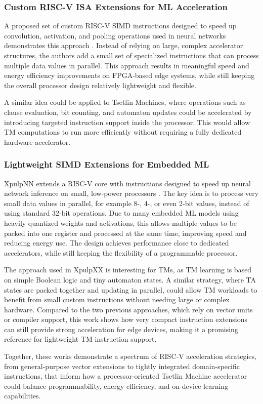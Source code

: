 \subsubsection{Custom RISC-V ISA Extensions for ML Acceleration}
A proposed set of custom RISC-V SIMD instructions designed to speed up convolution, activation, and pooling operations used in neural networks demonstrates this approach \cite{WangShihang2024OCCU}. Instead of relying on large, complex accelerator structures, the authors add a small set of specialized instructions that can process multiple data values in parallel. This approach results in meaningful speed and energy efficiency improvements on FPGA-based edge systems, while still keeping the overall processor design relatively lightweight and flexible.

A similar idea could be applied to Tsetlin Machines, where operations such as clause evaluation, bit counting, and automaton updates could be accelerated by introducing targeted instruction support inside the processor. This would allow TM computations to run more efficiently without requiring a fully dedicated hardware accelerator.

\subsubsection{Lightweight SIMD Extensions for Embedded ML}
XpulpNN extends a RISC-V core with instructions designed to speed up neural network inference on small, low-power processors \cite{GarofaloAngelo2021XEEE}.  The key idea is to process very small data values in parallel, for example 8-, 4-, or even 2-bit values, instead of using standard 32-bit operations. Due to many embedded ML models using heavily quantized weights and activations, this allows multiple values to be packed into one register and processed at the same time, improving speed and reducing energy use. The design achieves performance close to dedicated accelerators, while still keeping the flexibility of a programmable processor.

The approach used in XpulpXX is interesting for TMs, as TM learning is based on simple Boolean logic and tiny automaton states. A similar strategy, where TA states are packed together and updating in parallel, could allow TM workloads to benefit from small custom instructions without needing large or complex hardware.
Compared to the two previous approaches, which rely on vector units or compiler support, this work shows how very compact instruction extensions can still provide strong acceleration for edge devices, making it a promising reference for lightweight TM instruction support.

Together, these works demonstrate a spectrum of RISC-V acceleration strategies, from general-purpose vector extensions to tightly integrated domain-specific instructions, that inform how a processor-oriented Tsetlin Machine accelerator could balance programmability, energy efficiency, and on-device learning capabilities.
